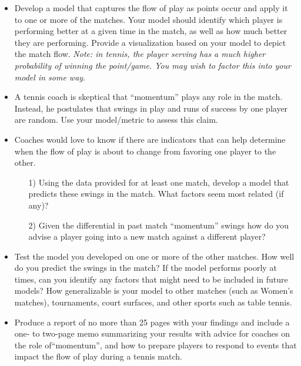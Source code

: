 \documentclass[12pt]{article}  %
\begin{document}
\begin{itemize}
	\setlength{\parsep}{0ex} %
	\setlength{\topsep}{2ex} %
	\setlength{\itemsep}{1ex} %
	\item Develop a model that captures the flow of play as points occur and apply it to one or more of the matches. Your model should identify which player is performing better at a given time in the match, as well as how much better they are performing. Provide a visualization based on your model to depict the match flow. \textit{Note: in tennis, the player serving has a much higher probability of winning the point/game. You may wish to factor this into your model in some way.}
	\item A tennis coach is skeptical that “momentum” plays any role in the match. Instead, he postulates that swings in play and runs of success by one player are random. Use your model/metric to assess this claim.
	\item Coaches would love to know if there are indicators that can help determine when the flow of play is about to change from favoring one player to the other.
	\begin{itemize}
		\item[1)]
		Using the data provided for at least one match, develop a model that predicts these swings in the match. What factors seem most related (if any)?
	\end{itemize}
	\begin{itemize}
		\item[2)]
		Given the differential in past match “momentum” swings how do you advise a player going into a new match against a different player?
	\end{itemize}
	\item Test the model you developed on one or more of the other matches. How well do you predict the swings in the match? If the model performs poorly at times, can you identify any factors that might need to be included in future models? How generalizable is your model to other matches (such as Women’s matches), tournaments, court surfaces, and other sports such as table tennis.
	\item Produce a report of no more than 25 pages with your findings and include a one- to two-page memo summarizing your results with advice for coaches on the role of“momentum”, and how to prepare players to respond to events that impact the flow of play during a tennis match.
\end{itemize}
\end{document}
